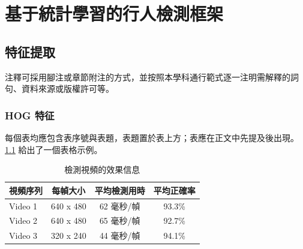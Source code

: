 \chapter{基于統計學習的行人檢測框架}

\section{特征提取}
注釋可採用腳注或章節附注的方式，並按照本學科通行範式逐一注明需解釋的詞句、資料來源或版權許可等。

\subsection{HOG 特征}
每個表均應包含表序號與表題，表題置於表上方；表應在正文中先提及後出現。\cref{tab:video-info} 給出了一個表格示例。

\begin{table}[htbp]
  \centering
  \caption{檢測視頻的效果信息}
  \label{tab:video-info}
  \vspace{0.2cm}
  \begin{tabular}{lccc}
    \toprule
    視頻序列 & 每幀大小 & 平均檢測用時 & 平均正確率 \\
    \midrule
    Video 1 & 640 x 480 & 62 毫秒/幀 & 93.3\% \\
    Video 2 & 640 x 480 & 65 毫秒/幀 & 92.7\% \\
    Video 3 & 320 x 240 & 44 毫秒/幀 & 94.1\% \\
    \bottomrule
  \end{tabular}
\end{table}

